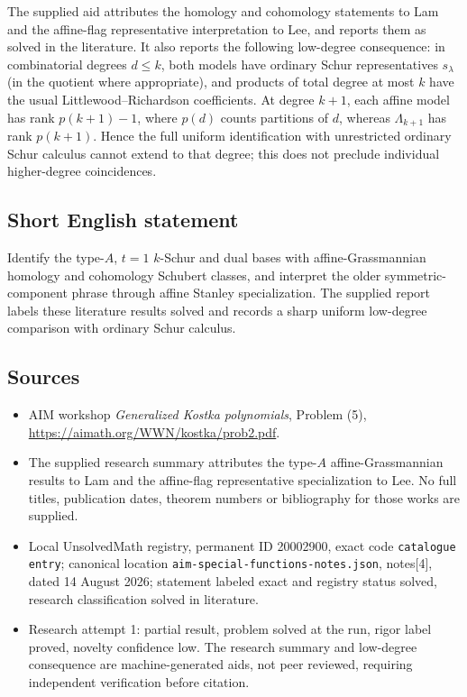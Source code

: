 \documentclass[11pt]{article}
\begin{document}
The supplied aid attributes the homology and cohomology statements to Lam and the affine-flag representative interpretation to Lee, and reports them as solved in the literature. It also reports the following low-degree consequence: in combinatorial degrees \(d\le k\), both models have ordinary Schur representatives \(s_\lambda\) (in the quotient where appropriate), and products of total degree at most \(k\) have the usual Littlewood--Richardson coefficients. At degree \(k+1\), each affine model has rank \(p(k+1)-1\), where \(p(d)\) counts partitions of \(d\), whereas \(\Lambda_{k+1}\) has rank \(p(k+1)\). Hence the full uniform identification with unrestricted ordinary Schur calculus cannot extend to that degree; this does not preclude individual higher-degree coincidences.
\subsection{Short English statement}
Identify the type-\(A\), \(t=1\) \(k\)-Schur and dual bases with affine-Grassmannian homology and cohomology Schubert classes, and interpret the older symmetric-component phrase through affine Stanley specialization. The supplied report labels these literature results solved and records a sharp uniform low-degree comparison with ordinary Schur calculus.
\subsection{Sources}
\begin{itemize}
\item AIM workshop \emph{Generalized Kostka polynomials}, Problem (5), \url{https://aimath.org/WWN/kostka/prob2.pdf}.
\item The supplied research summary attributes the type-\(A\) affine-Grassmannian results to Lam and the affine-flag representative specialization to Lee. No full titles, publication dates, theorem numbers or bibliography for those works are supplied.
\item Local UnsolvedMath registry, permanent ID 20002900, exact code \texttt{catalogue entry}; canonical location \texttt{aim-special-functions-notes.json}, notes[4], dated 14 August 2026; statement labeled exact and registry status solved, research classification solved in literature.
\item Research attempt 1: partial result, problem solved at the run, rigor label proved, novelty confidence low. The research summary and low-degree consequence are machine-generated aids, not peer reviewed, requiring independent verification before citation.
\end{itemize}
\end{document}
